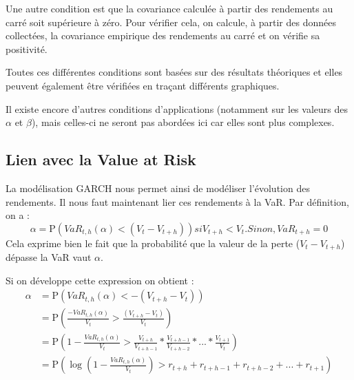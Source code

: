 			Une autre condition est que la covariance calculée à partir des rendements au carré soit supérieure à zéro.
			Pour vérifier cela, on calcule, à partir des données collectées, la covariance empirique des rendements au carré et on vérifie sa positivité.

			Toutes ces différentes conditions sont basées sur des résultats théoriques et elles peuvent également être vérifiées en traçant différents graphiques.

			Il existe encore d'autres conditions d'applications (notamment sur les valeurs des $\alpha$ et $\beta$), mais celles-ci ne seront pas abordées ici car elles sont plus complexes.


		\subsection{Lien avec la Value at Risk}
			La modélisation GARCH nous permet ainsi de modéliser l'évolution des rendements. Il nous faut maintenant lier ces rendements à la VaR.
			Par définition, on a :
			\[\alpha = \mathrm{P}(VaR_{t,h}(\alpha) < (V_t - V_{t+h})) si V_{t+h} < V_t. Sinon, VaR_{t+h} = 0\]
			Cela exprime bien le fait que la probabilité que la valeur de la perte ($V_t - V_{t+h}$) dépasse la VaR vaut $\alpha$.
			
			Si on développe cette expression on obtient : 
\begin{align*}
\alpha &= \mathrm{P}(VaR_{t,h}(\alpha) < -(V_{t+h} - V_t))\\
			&= \mathrm{P}\left(\frac{-VaR_{t,h}(\alpha)}{V_t} > \frac{(V_{t+h} - V_t)}{V_t}\right)\\
			&= \mathrm{P}\left(1-\frac{VaR_{t,h}(\alpha)}{V_t} > \frac{V_{t+h}}{V_{t+h-1}}*\frac{V_{t+h-1}}{V_{t+h-2}}*...*\frac{V_{t+1}}{V_{t}}\right)\\
			&= \mathrm{P}\left(\log (1-\frac{VaR_{t,h}(\alpha)}{V_t}) > r_{t+h}+r_{t+h-1}+r_{t+h-2}+...+r_{t+1}\right)
\end{align*}


